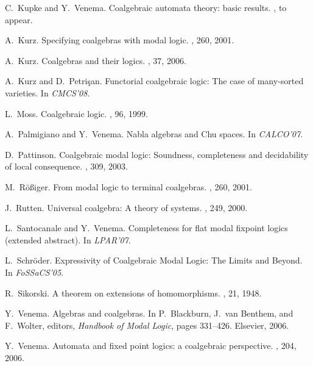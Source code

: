 \documentclass{book}
\begin{document}
\begin{thebibliography}{10}
C.~Kupke and Y.~Venema.
\newblock Coalgebraic automata theory: basic results.
, to appear.

A.~Kurz.
\newblock Specifying coalgebras with modal logic.
, 260, 2001.

A.~Kurz.
\newblock Coalgebras and their logics.
, 37, 2006.

A.~Kurz and D.~Petri{\c s}an.
\newblock Functorial coalgebraic logic: The case of many-sorted varieties.
\newblock In {\em CMCS'08}.

L.~Moss.
\newblock Coalgebraic logic.
, 96, 1999.

A.~Palmigiano and Y.~Venema.
\newblock Nabla algebras and {C}hu spaces.
\newblock In {\em CALCO'07}.

D.~Pattinson.
\newblock Coalgebraic modal logic: Soundness, completeness and decidability of
  local consequence.
, 309, 2003.

M.~R{\"o}{\ss}iger.
\newblock From modal logic to terminal coalgebras.
, 260, 2001.

J.~Rutten.
\newblock Universal coalgebra: {A} theory of systems.
, 249, 2000.

L.~Santocanale and Y.~Venema.
\newblock Completeness for flat modal fixpoint logics (extended abstract).
\newblock In {\em LPAR'07}.

L.~Schr\"oder.
\newblock Expressivity of {C}oalgebraic {M}odal {L}ogic: {T}he {L}imits and
  {B}eyond.
\newblock In {\em FoSSaCS'05}.

R.~Sikorski.
\newblock A theorem on extensions of homomorphisms.
, 21, 1948.

Y.~Venema.
\newblock Algebras and coalgebras.
\newblock In P.~Blackburn, J.~van Benthem, and F.~Wolter, editors, {\em
  Handbook of Modal Logic}, pages 331--426. Elsevier, 2006.

Y.~Venema.
\newblock Automata and fixed point logics: a coalgebraic perspective.
, 204, 2006.

\end{thebibliography}
\end{document}
